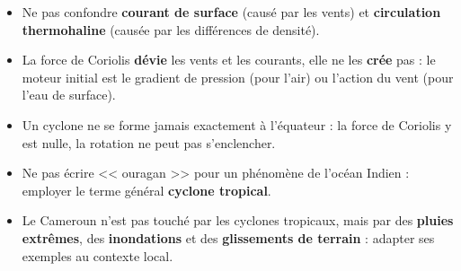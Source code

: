 \documentclass[11pt]{article}
\begin{document}
\begin{attention}
\begin{itemize}
  \item Ne pas confondre \textbf{courant de surface} (causé par les vents) et \textbf{circulation thermohaline} (causée par les différences de densité).
  \item La force de Coriolis \textbf{dévie} les vents et les courants, elle ne les \textbf{crée} pas : le moteur initial est le gradient de pression (pour l'air) ou l'action du vent (pour l'eau de surface).
  \item Un cyclone ne se forme jamais exactement à l'équateur : la force de Coriolis y est nulle, la rotation ne peut pas s'enclencher.
  \item Ne pas écrire << ouragan >> pour un phénomène de l'océan Indien : employer le terme général \textbf{cyclone tropical}.
  \item Le Cameroun n'est pas touché par les cyclones tropicaux, mais par des \textbf{pluies extrêmes}, des \textbf{inondations} et des \textbf{glissements de terrain} : adapter ses exemples au contexte local.
\end{itemize}
\end{attention}
\end{document}

